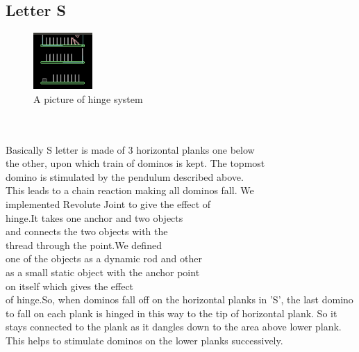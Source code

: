 \subsection{Letter S}
\begin{figure}
	\caption{A picture of hinge system}
	\centering
	 \includegraphics[width=0.2\textwidth]{./doc/S.png}%
\end{figure}
\begin{frame}
\centering
\\
\\
Basically S letter is made of 3 horizontal planks one below\\ the other, upon which train of dominos is kept.
The topmost \\domino is stimulated by the pendulum described above. \\This leads to a chain reaction making all dominos fall.
We \\implemented Revolute Joint to give the effect of\\ hinge.It takes one anchor and two objects\\ and connects the two objects with the\\ thread through the point.We defined\\ one of the objects as a dynamic rod and other\\ as a small static object with the anchor point\\ on itself which gives the effect\\ of hinge.So, when dominos fall off on the horizontal planks in 'S', the last domino to fall on each plank is hinged in this way to the tip of horizontal plank. So it stays connected to the plank as it dangles down to the area above lower plank. This helps to stimulate dominos on the lower planks successively.
\end{frame}
\\
\newpage
